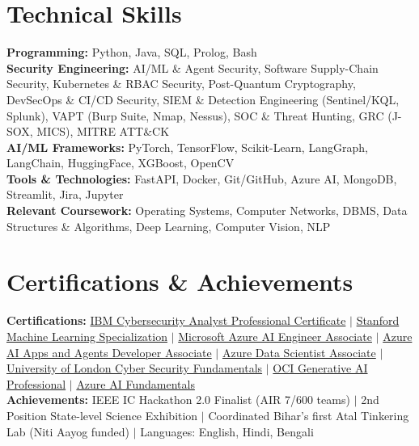 \documentclass[11pt,a4paper]{article}
\begin{document}
\vspace{-2pt}

\section{Technical Skills}
\vspace{-2pt}
\textbf{Programming:} Python, Java, SQL, Prolog, Bash \\
\textbf{Security Engineering:} AI/ML \& Agent Security, Software Supply-Chain Security, Kubernetes \& RBAC Security, Post-Quantum Cryptography, DevSecOps \& CI/CD Security, SIEM \& Detection Engineering (Sentinel/KQL, Splunk), VAPT (Burp Suite, Nmap, Nessus), SOC \& Threat Hunting, GRC (J-SOX, MICS), MITRE ATT\&CK \\
\textbf{AI/ML Frameworks:} PyTorch, TensorFlow, Scikit-Learn, LangGraph, LangChain, HuggingFace, XGBoost, OpenCV \\
\textbf{Tools \& Technologies:} FastAPI, Docker, Git/GitHub, Azure AI, MongoDB, Streamlit, Jira, Jupyter \\
\textbf{Relevant Coursework:} Operating Systems, Computer Networks, DBMS, Data Structures \& Algorithms, Deep Learning, Computer Vision, NLP

\section{Certifications \& Achievements}
\vspace{-2pt}
\textbf{Certifications:} \href{https://coursera.org/share/62b7320c3e53f81b4150e23d3e86c177}{IBM Cybersecurity Analyst Professional Certificate} $|$ \href{https://coursera.org/share/ad7d41c1bf4e64d3c3cffe247266a968}{Stanford Machine Learning Specialization} $|$ \href{https://learn.microsoft.com/en-us/users/mohitkumar-5451/credentials/fb7576bab685e9be}{Microsoft Azure AI Engineer Associate} $|$ \href{https://learn.microsoft.com/en-us/users/mohitkumar-5451/credentials/f22d515fb88750a5}{Azure AI Apps and Agents Developer Associate} $|$ \href{https://learn.microsoft.com/en-us/users/mohitkumar-5451/credentials/2117bf954dcdc5a5}{Azure Data Scientist Associate} $|$ \href{https://coursera.org/share/41ae000d50e2502a39c4c17e39b36ca6}{University of London Cyber Security Fundamentals} $|$ \href{https://catalog-education.oracle.com/ords/certview/sharebadge?id=CBA45575ECD2EA410B506FCD77CA2328F3CC8F54EE1EC201032A8490BDB46348}{OCI Generative AI Professional} $|$ \href{https://www.credly.com/badges/502f6d52-f56b-4bd7-8b4c-e3364c5acc8b/linked_in_profile}{Azure AI Fundamentals} \\
\textbf{Achievements:} IEEE IC Hackathon 2.0 Finalist (AIR 7/600 teams) $|$ 2nd Position State-level Science Exhibition $|$ Coordinated Bihar's first Atal Tinkering Lab (Niti Aayog funded) $|$ Languages: English, Hindi, Bengali
\end{document}
